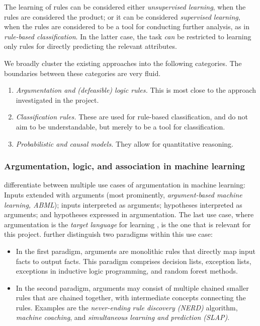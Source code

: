 The learning of rules can be considered either \textit{unsupervised learning}, when the rules are considered the product; or it can be considered \textit{supervised learning}, when the rules are considered to be a tool for conducting further analysis, as in \textit{rule-based classification}. In the latter case, the task \textit{can} be restricted to learning only rules for directly predicting the relevant attributes.

We broadly cluster the existing approaches into the following categories. The boundaries between these categories are very fluid.

\begin{enumerate}
    \item \textit{Argumentation and (defeasible) logic rules.} This is most close to the approach investigated in the project.
    \item \textit{Classification rules.} These are used for rule-based classification, and do not aim to be understandable, but merely to be a tool for classification. 
    \item \textit{Probabilistic and causal models.} They allow for quantitative reasoning.
\end{enumerate}

\subsubsection{Argumentation, logic, and association in machine learning}

\citet{kakasAbductionArgumentationExplainable2020} differentiate between multiple use cases of argumentation in machine learning: Inputs extended with arguments (most prominently, \textit{argument-based machine learning, ABML}); inputs interpreted as arguments; hypotheses interpreted as arguments; and hypotheses expressed in argumentation. The last use case, where argumentation is the \textit{target language} for learning \citep[p.~17]{kakasAbductionArgumentationExplainable2020}, is the one that is relevant for this project. \citet{kakasAbductionArgumentationExplainable2020} further distinguish two paradigms within this use case: 

\begin{itemize}
    \item In the first paradigm, arguments are monolithic rules that directly map input facts to output facts. This paradigm comprises decision lists, exception lists, exceptions in inductive logic programming, and random forest methods.
    \item In the second paradigm, arguments may consist of multiple chained smaller rules that are chained together, with intermediate concepts connecting the rules. Examples are the \textit{never-ending rule discovery (NERD)} algorithm, \textit{machine coaching}, and \textit{simultaneous learning and prediction (SLAP)}. 
\end{itemize}

